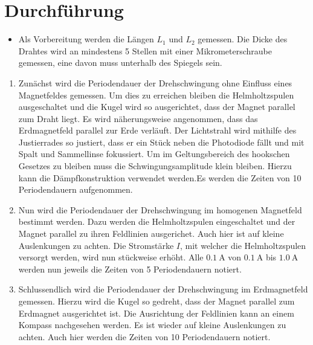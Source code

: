 
\section{Durchführung}
\label{sec:Durchführung}

\begin{itemize}
   \item Als Vorbereitung werden die Längen $L_1$ und $L_2$ gemessen. Die Dicke des
   Drahtes wird an mindestens 5 Stellen mit einer Mikrometerschraube gemessen,
   eine davon muss unterhalb des Spiegels sein.
\end{itemize}
\renewcommand{\labelenumi}{\alph{enumi})}

\begin{enumerate}
  \item Zunächst wird die Periodendauer der Drehschwingung ohne Einfluss
   eines Magnetfeldes gemessen. Um dies zu erreichen bleiben die Helmholtzspulen
    ausgeschaltet und die Kugel wird so ausgerichtet, dass der Magnet parallel zum Draht
    liegt. Es wird näherungsweise angenommen, dass das Erdmagnetfeld parallel zur Erde
    verläuft. Der Lichtstrahl wird mithilfe des Justierrades so justiert,
     dass er ein Stück neben die Photodiode fällt und mit Spalt und Sammellinse
      fokussiert. Um im Geltungsbereich des hookschen Gesetzes zu bleiben muss
       die Schwingungsamplitude klein bleiben. Hierzu kann die Dämpfkonstruktion
        verwendet werden.Es werden die Zeiten von 10 Periodendauern aufgenommen.

        \item Nun wird die Periodendauer der Drehschwingung im
         homogenen Magnetfeld bestimmt werden. Dazu werden die Helmholtzspulen
          eingeschaltet und der Magnet parallel zu ihren Feldlinien ausgerichet.
           Auch hier ist auf kleine Auslenkungen zu achten.
          Die Stromstärke $I$, mit welcher die Helmholtzspulen versorgt werden,
           wird nun stückweise erhöht. Alle $\SI{0.1}{\ampere}$ von
           $\SI{0.1}{\ampere}$ bis $\SI{1.0}{\ampere}$ werden nun jeweils die
            Zeiten von 5 Periodendauern notiert.

      \item Schlussendlich wird die Periodendauer der Drehschwingung im Erdmagnetfeld gemessen.
       Hierzu wird die Kugel so gedreht, dass der Magnet parallel zum Erdmagnet
        ausgerichtet ist. Die Ausrichtung der Feldlinien kann an einem Kompass
         nachgesehen werden. Es ist wieder auf kleine Auslenkungen zu achten.
          Auch hier werden die Zeiten von 10 Periodendauern notiert.



\end{enumerate}
